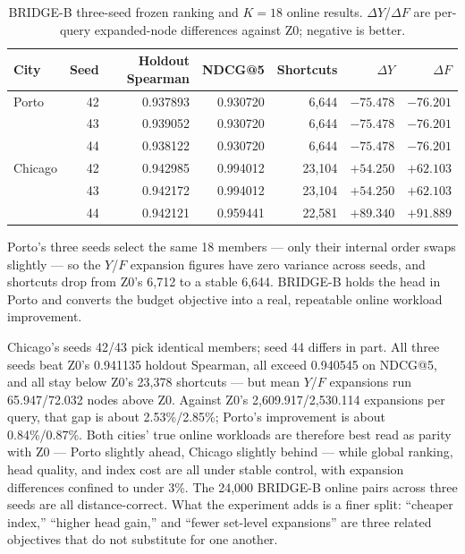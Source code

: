 \documentclass[5p,twocolumn,authoryear]{elsarticle}
\newenvironment{paperwidetable}{\begin{table}[t]}{\end{table}}
\newenvironment{paperwidetable}{\begin{table}[H]}{\end{table}}
\newcommand{\zmethod}{Z0}
\newcommand{\bmethod}{BRIDGE-B}
\begin{document}
\begin{paperwidetable}
  \centering
  \caption{\bmethod{} three-seed frozen ranking and $K{=}18$ online results.
  $\Delta Y$/$\Delta F$ are per-query expanded-node differences against \zmethod;
  negative is better.}
  \label{tab:bridgeb}
  \begin{tabular}{lrrrrrr}
    \toprule
    City & Seed & Holdout Spearman & NDCG@5 & Shortcuts & $\Delta Y$ & $\Delta F$ \\
    \midrule
    Porto & 42 & 0.937893 & 0.930720 & 6,644 & $\mathbf{-75.478}$ & $\mathbf{-76.201}$ \\
          & 43 & 0.939052 & 0.930720 & 6,644 & $\mathbf{-75.478}$ & $\mathbf{-76.201}$ \\
          & 44 & 0.938122 & 0.930720 & 6,644 & $\mathbf{-75.478}$ & $\mathbf{-76.201}$ \\
    \midrule
    Chicago & 42 & 0.942985 & 0.994012 & 23,104 & $+54.250$ & $+62.103$ \\
            & 43 & 0.942172 & 0.994012 & 23,104 & $+54.250$ & $+62.103$ \\
            & 44 & 0.942121 & 0.959441 & 22,581 & $+89.340$ & $+91.889$ \\
    \bottomrule
  \end{tabular}
\end{paperwidetable}

Porto's three seeds select the same 18 members --- only their internal order swaps
slightly --- so the $Y$/$F$ expansion figures have zero variance across seeds, and
shortcuts drop from \zmethod's 6{,}712 to a stable 6{,}644. \bmethod{} holds the head in
Porto and converts the budget objective into a real, repeatable online workload
improvement.

Chicago's seeds 42/43 pick identical members; seed 44 differs in part. All three seeds
beat \zmethod's 0.941135 holdout Spearman, all exceed 0.940545 on NDCG@5, and all stay
below \zmethod's 23{,}378 shortcuts --- but mean $Y$/$F$ expansions run 65.947/72.032 nodes
above \zmethod. Against \zmethod's 2{,}609.917/2{,}530.114 expansions per query, that gap
is about 2.53\%/2.85\%; Porto's improvement is about 0.84\%/0.87\%. Both cities' true
online workloads are therefore best read as parity with \zmethod{} --- Porto slightly
ahead, Chicago slightly behind --- while global ranking, head quality, and index cost are
all under stable control, with expansion differences confined to under 3\%. The 24{,}000
\bmethod{} online pairs across three seeds are all distance-correct. What the experiment
adds is a finer split: ``cheaper index,'' ``higher head gain,'' and ``fewer set-level
expansions'' are three related objectives that do not substitute for one another.
\end{document}
